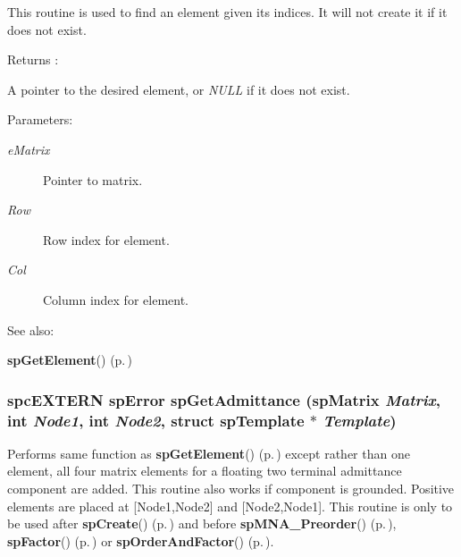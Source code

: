 This routine is used to find an element given its indices. It will not create it if it does not exist.

\begin{Desc}
\item[Returns :]\par
 A pointer to the desired element, or {\em NULL} if it does not exist.\end{Desc}
\begin{Desc}
\item[Parameters: ]\par
\begin{description}
\item[{\em 
e\-Matrix}]Pointer to matrix. \item[{\em 
Row}]Row index for element. \item[{\em 
Col}]Column index for element.\end{description}
\end{Desc}
\begin{Desc}
\item[See also: ]\par
{\bf sp\-Get\-Element}() {\rm (p.\,\pageref{spMatrix_8h_a36})} \end{Desc}
\subsubsection{\setlength{\rightskip}{0pt plus 5cm}spc\-EXTERN {\bf sp\-Error} sp\-Get\-Admittance ({\bf sp\-Matrix} {\em Matrix}, int {\em Node1}, int {\em Node2}, struct {\bf sp\-Template} $\ast$ {\em Template})}\label{spMatrix_8h_a35}


Performs same function as {\bf sp\-Get\-Element}() {\rm (p.\,\pageref{spMatrix_8h_a36})} except rather than one element, all four matrix elements for a floating two terminal admittance component are added. This routine also works if component is grounded. Positive elements are placed at [Node1,Node2] and [Node2,Node1]. This routine is only to be used after {\bf sp\-Create}() {\rm (p.\,\pageref{spMatrix_8h_a24})} and before {\bf sp\-MNA\_\-Preorder}() {\rm (p.\,\pageref{spMatrix_8h_a44})}, {\bf sp\-Factor}() {\rm (p.\,\pageref{spMatrix_8h_a30})} or {\bf sp\-Order\-And\-Factor}() {\rm (p.\,\pageref{spMatrix_8h_a46})}.

